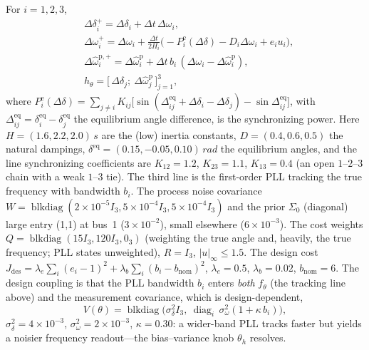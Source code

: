 \documentclass[twocolumn,amsthm]{autart}
\begin{document}
For $i=1,2,3$,
\begin{subequations}\label{eq:pll-model}
\begin{align}
&\Delta\delta_i^{+} = \Delta\delta_i + \Delta t\,\Delta\omega_i,\\
&\Delta\omega_i^{+} = \Delta\omega_i + \tfrac{\Delta t}{2H_i}
   \big(\!-P_i^{\mathrm e}(\Delta\delta) - D_i\Delta\omega_i + e_i u_i\big),\\
&\Delta\hat\omega^{\mathrm p,+}_i = \Delta\hat\omega^{\mathrm p}_i
   + \Delta t\,b_i\,(\Delta\omega_i - \Delta\hat\omega^{\mathrm p}_i),\\
&h_\theta = \big[\,\Delta\delta_j;\ \Delta\hat\omega^{\mathrm p}_j\,\big]_{j=1}^{3},
\end{align}
\end{subequations}
where $P_i^{\mathrm e}(\Delta\delta)=\sum_{j\neq i}K_{ij}\big[\sin(\Delta^{\mathrm{eq}}_{ij}
+\Delta\delta_i-\Delta\delta_j)-\sin\Delta^{\mathrm{eq}}_{ij}\big]$, with
$\Delta^{\mathrm{eq}}_{ij}=\delta^{\mathrm{eq}}_i-\delta^{\mathrm{eq}}_j$ the
equilibrium angle difference, is the synchronizing
power. Here $H=(1.6,2.2,2.0)\,\si{s}$ are the (low) inertia constants,
$D=(0.4,0.6,0.5)$ the natural dampings, $\delta^{\mathrm{eq}}=(0.15,-0.05,0.10)\,
\si{rad}$ the equilibrium angles, and the line synchronizing coefficients are
$K_{12}=1.2$, $K_{23}=1.1$, $K_{13}=0.4$ (an open $1$--$2$--$3$ chain with a weak
$1$--$3$ tie). The third line is the first-order PLL tracking the true
frequency with bandwidth $b_i$. The process noise covariance $W=\operatorname{blkdiag}
(2\!\times\!10^{-5}I_3,5\!\times\!10^{-4}I_3,5\!\times\!10^{-4}I_3)$ and the prior
$\Sigma_0$ (diagonal) large entry (1,1) at bus~1 ($3\!\times\!10^{-2}$), small elsewhere
($6\!\times\!10^{-3}$). The cost weights $Q=\operatorname{blkdiag}(15I_3,120I_3,0_3)$
(weighting the true angle and, heavily, the true frequency; PLL states
unweighted), $R=I_3$, $|u|_\infty\le1.5$. The design cost 
$J_{\mathrm{des}}=\lambda_e\sum_i(e_i-1)^2+\lambda_b\sum_i(b_i-b_{\mathrm{nom}})^2$,
$\lambda_e=0.5$, $\lambda_b=0.02$, $b_{\mathrm{nom}}=6$. The design coupling is
that the PLL bandwidth $b_i$ enters \emph{both} $f_\theta$ (the tracking line above)
and the measurement covariance, which is design-dependent,
\begin{equation}\label{eq:pll-V}
V(\theta)=\operatorname{blkdiag}\!\big(\sigma_\delta^2 I_3,\
\operatorname{diag}_i\,\sigma_\omega^2(1+\kappa\,b_i)\big),
\end{equation}
$\sigma_\delta^2=4\!\times\!10^{-3}$, $\sigma_\omega^2=2\!\times\!10^{-3}$,
$\kappa=0.30$: a wider-band PLL tracks faster but yields a noisier frequency
readout---the bias--variance knob $\theta_h$ resolves.
\end{document}

